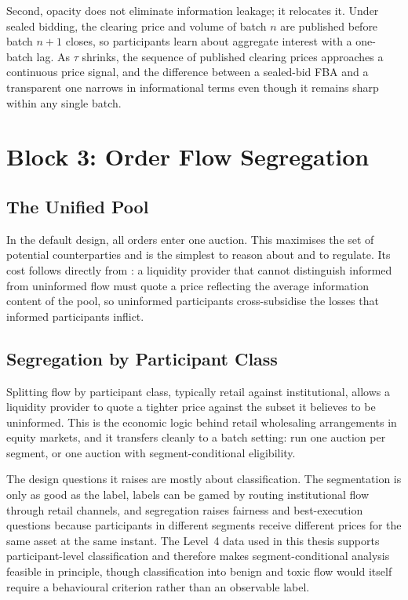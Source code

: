 Second, opacity does not eliminate information leakage; it relocates it.
Under sealed bidding, the clearing price and volume of batch $n$ are
published before batch $n+1$ closes, so participants learn about
aggregate interest with a one-batch lag. As $\tau$ shrinks, the sequence
of published clearing prices approaches a continuous price signal, and
the difference between a sealed-bid FBA and a transparent one narrows in
informational terms even though it remains sharp within any single
batch.

\section{Block 3: Order Flow Segregation}
\label{sec:segregation}

\subsection{The Unified Pool}

In the default design, all orders enter one auction. This maximises the
set of potential counterparties and is the simplest to reason about and
to regulate. Its cost follows directly from \citet{glosten1985bid}: a
liquidity provider that cannot distinguish informed from uninformed flow
must quote a price reflecting the average information content of the
pool, so uninformed participants cross-subsidise the losses that
informed participants inflict.

\subsection{Segregation by Participant Class}

Splitting flow by participant class, typically retail against
institutional, allows a liquidity provider to quote a tighter price
against the subset it believes to be uninformed. This is the economic
logic behind retail wholesaling arrangements in equity markets, and it
transfers cleanly to a batch setting: run one auction per segment, or
one auction with segment-conditional eligibility.

The design questions it raises are mostly about classification. The
segmentation is only as good as the label, labels can be gamed by
routing institutional flow through retail channels, and segregation
raises fairness and best-execution questions because participants in
different segments receive different prices for the same asset at the
same instant. The Level~4 data used in this thesis supports
participant-level classification and therefore makes segment-conditional
analysis feasible in principle, though classification into benign and
toxic flow would itself require a behavioural criterion rather than an
observable label.

